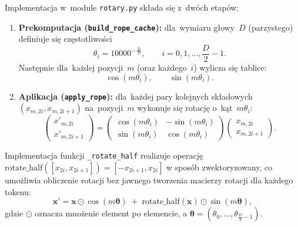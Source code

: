 \documentclass[a4paper,11pt,twoside]{report}
\theoremstyle{definition}
\begin{document}
Implementacja w~module \texttt{rotary.py} składa się z~dwóch etapów:
\begin{enumerate}
    \item \textbf{Prekomputacja (\texttt{build\_rope\_cache}):}
    dla~wymiaru głowy~\(D\) (parzystego) definiuje się częstotliwości
    \begin{equation}
        \theta_i = 10000^{-\,\frac{2i}{D}},
        \qquad i=0,1,\dots,\frac{D}{2}-1.
    \end{equation}
    Następnie dla~każdej pozycji~\(m\) (oraz każdego~\(i\)) wylicza się tablice:
    \begin{equation}
        \cos(m\theta_i), \qquad \sin(m\theta_i).
    \end{equation}

    \item \textbf{Aplikacja (\texttt{apply\_rope}):}
    dla~każdej pary kolejnych składowych \((x_{m,2i}, x_{m,2i+1})\) na~pozycji~\(m\)
    wykonuje się rotację o~kąt~\(m\theta_i\):
    \begin{equation}
    \begin{pmatrix}
        x'_{m,2i} \\[2pt]
        x'_{m,2i+1}
    \end{pmatrix}
    =
    \begin{pmatrix}
        \cos(m\theta_i) & -\sin(m\theta_i) \\
        \sin(m\theta_i) & \cos(m\theta_i)
    \end{pmatrix}
    \begin{pmatrix}
        x_{m,2i} \\[2pt]
        x_{m,2i+1}
    \end{pmatrix}.
    \end{equation}
\end{enumerate}


Implementacja funkcji \texttt{\_rotate\_half} realizuje operację
\(\mathrm{rotate\_half}([x_{2i},x_{2i+1}]) = [-x_{2i+1}, x_{2i}]\) w sposób zwektoryzowany,
co umożliwia obliczenie rotacji bez jawnego tworzenia macierzy rotacji dla każdego tokenu:
\begin{equation}
\mathbf{x}' = \mathbf{x}\odot \cos(m\boldsymbol{\theta}) \;+\; \mathrm{rotate\_half}(\mathbf{x})\odot \sin(m\boldsymbol{\theta}),
\end{equation}
gdzie \(\odot\) oznacza mnożenie element po elemencie, a \(\boldsymbol{\theta}=(\theta_0,\dots,\theta_{\frac{D}{2}-1})\).
\end{document}
